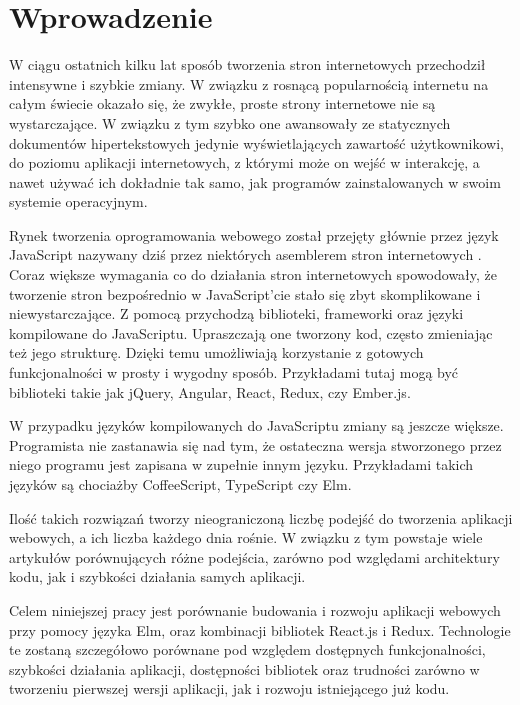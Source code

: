 \chapter{Wprowadzenie} \label{chap:wprowadzenie}

W ciągu ostatnich kilku lat sposób tworzenia stron internetowych przechodził intensywne i szybkie zmiany. W związku z rosnącą popularnością internetu na całym świecie okazało się, że zwykłe, proste strony internetowe nie są wystarczające. W związku z tym szybko one awansowały ze statycznych dokumentów hipertekstowych jedynie wyświetlających zawartość użytkownikowi, do poziomu aplikacji internetowych, z którymi może on wejść w interakcję, a nawet używać ich dokładnie tak samo, jak programów zainstalowanych w swoim systemie operacyjnym. 

Rynek tworzenia oprogramowania webowego został przejęty głównie przez język JavaScript nazywany dziś przez niektórych asemblerem stron internetowych \cite{JSAssembly}. Coraz większe wymagania co do działania stron internetowych spowodowały, że tworzenie stron bezpośrednio w JavaScript'cie stało się zbyt skomplikowane i niewystarczające. Z pomocą przychodzą biblioteki, frameworki oraz języki kompilowane do JavaScriptu. Upraszczają one tworzony kod, często zmieniając też jego strukturę. Dzięki temu umożliwiają korzystanie z gotowych funkcjonalności w prosty i wygodny sposób. Przykładami tutaj mogą być biblioteki takie jak jQuery, Angular, React, Redux, czy Ember.js. 

W przypadku języków kompilowanych do JavaScriptu zmiany są jeszcze większe. Programista nie zastanawia się nad tym, że ostateczna wersja stworzonego przez niego programu jest zapisana w zupełnie innym języku. Przykładami takich języków są chociażby CoffeeScript, TypeScript czy Elm.

Ilość takich rozwiązań tworzy nieograniczoną liczbę podejść do tworzenia aplikacji webowych, a ich liczba każdego dnia rośnie. W związku z tym powstaje wiele artykułów porównujących różne podejścia, zarówno pod względami architektury kodu, jak i szybkości działania samych aplikacji.

Celem niniejszej pracy jest porównanie budowania i rozwoju aplikacji webowych przy pomocy języka Elm, oraz kombinacji bibliotek React.js i Redux. Technologie te zostaną szczegółowo porównane pod względem dostępnych funkcjonalności, szybkości działania aplikacji, dostępności bibliotek oraz trudności zarówno w tworzeniu pierwszej wersji aplikacji, jak i rozwoju istniejącego już kodu.

